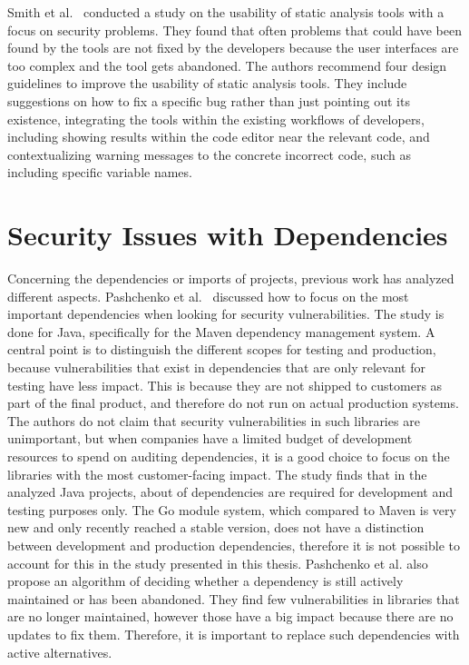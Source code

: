 Smith et al.~\cite{smith2020} conducted a study on the usability of static analysis tools with a focus on security
problems.
They found that often problems that could have been found by the tools are not fixed by the developers because the user
interfaces are too complex and the tool gets abandoned.
The authors recommend four design guidelines to improve the usability of static analysis tools.
They include suggestions on how to fix a specific bug rather than just pointing out its existence, integrating the tools
within the existing workflows of developers, including showing results within the code editor near the relevant code,
and contextualizing warning messages to the concrete incorrect code, such as including specific variable names.



\section{Security Issues with Dependencies}\label{sec:related-work:dependency-issues}

Concerning the dependencies or imports of projects, previous work has analyzed different aspects.
Pashchenko et al.~\cite{pashchenko2018} discussed how to focus on the most important dependencies when looking for
security vulnerabilities.
The study is done for Java, specifically for the Maven dependency management system.
A central point is to distinguish the different scopes for testing and production, because vulnerabilities that exist in
dependencies that are only relevant for testing have less impact.
This is because they are not shipped to customers as part of the final product, and therefore do not run on actual
production systems.
The authors do not claim that security vulnerabilities in such libraries are unimportant, but when companies have a
limited budget of development resources to spend on auditing dependencies, it is a good choice to focus on the libraries
with the most customer-facing impact.
The study finds that in the analyzed Java projects, about  of dependencies are required for development
and testing purposes only.
The Go module system, which compared to Maven is very new and only recently reached a stable version, does not have a
distinction between development and production dependencies, therefore it is not possible to account for this in the
study presented in this thesis.
Pashchenko et al. also propose an algorithm of deciding whether a dependency is still actively maintained or has been
abandoned.
They find few vulnerabilities in libraries that are no longer maintained, however those have a big impact because there
are no updates to fix them.
Therefore, it is important to replace such dependencies with active alternatives.

